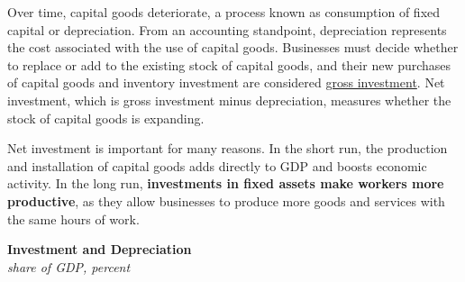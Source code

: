 \documentclass{report}
\makeatletter
\newcommand*\short[1]{\expandafter\@gobbletwo\number\numexpr#1\relax}
\newcommand{\stdnode}[3]{\node[below, align=left, shift=({#1,#2})]{#3};}
\newcommand{\shdateaxisticks}{
		date coordinates in=x, axis line style={draw=none},
		xmax={2024-01-31},
		max space between ticks=40,	    
		xtick={{1990-01-01}, {1995-01-01}, {2000-01-01}, 
			{2005-01-01}, {2010-01-01}, {2015-01-01}, {2020-01-01}},
		minor xtick={},
		enlarge y limits={0.06}, enlarge x limits={0.01},
		xticklabel style={align=center, yshift=-2pt}, tick label style={inner sep=0pt},
		}
\newcommand{\bbar}[2]{extra #1 ticks = {{#2}}, extra #1 tick labels = ,
		extra #1 tick style = {grid=major, grid style={thick, black!25}},}
\newcommand{\stdline}[4]{\addplot[very thick, no markers, color=#1] 
		table [x=#2, y=#3, col sep=comma] {#4};	}
\newcommand{\thickline}[4]{\addplot[ultra thick, no markers, color=#1] 
		table [x=#2, y=#3, col sep=comma] {#4};	}
\newcommand{\rbars}{
		\fill[color=black!10] (axis cs:{1990-07-01},\pgfkeysvalueof{/pgfplots/ymin})
			rectangle (axis cs:{1991-03-01}, \pgfkeysvalueof{/pgfplots/ymax});
		\fill[color=black!10] (axis cs:{2007-12-01},\pgfkeysvalueof{/pgfplots/ymin})
			rectangle (axis cs:{2009-07-01}, \pgfkeysvalueof{/pgfplots/ymax});
		\fill[color=black!10] (axis cs:{2001-03-01},\pgfkeysvalueof{/pgfplots/ymin})
			rectangle (axis cs:{2001-11-01}, \pgfkeysvalueof{/pgfplots/ymax});
		\fill[color=black!10] (axis cs:{2020-02-01},\pgfkeysvalueof{/pgfplots/ymin})
			rectangle (axis cs:{2020-05-01}, \pgfkeysvalueof{/pgfplots/ymax});}
\makeatother
\begin{document}
{\begin{minipage}{1.0\textwidth}
Over time, capital goods deteriorate, a process known as consumption of fixed capital or depreciation. From an accounting standpoint, depreciation represents the cost associated with the use of capital goods. Businesses must decide whether to replace or add to the existing stock of capital goods, and their new purchases of capital goods and inventory investment are considered \href{https://www.bea.gov/help/glossary/gross-private-domestic-investment}{gross investment}. Net investment, which is gross investment minus depreciation, measures whether the stock of capital goods is expanding.

Net investment is important for many reasons. In the short run, the production and installation of capital goods adds directly to GDP and boosts economic activity. In the long run, \textbf{investments in fixed assets make workers more productive}, as they allow businesses to produce more goods and services with the same hours of work. 
\end{minipage}
\vspace{1mm}

\begin{minipage}{0.355\textwidth}
\normalsize \textbf{Investment and Depreciation}\\
\footnotesize{\textit{share of GDP, percent}}
\vspace{6.5cm}

\hspace{2mm} 


\end{minipage}}
\end{document}
